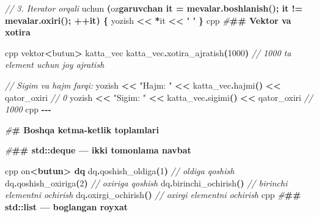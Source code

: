 \documentclass[a4paper,11pt,twoside,openright]{book}
\newenvironment{Shaded}{\begin{snugshade}}{\end{snugshade}}
\newcommand{\CharTok}[1]{\textcolor[rgb]{0.31,0.60,0.02}{#1}}
\newcommand{\CommentTok}[1]{\textcolor[rgb]{0.56,0.35,0.01}{\textit{#1}}}
\newcommand{\DecValTok}[1]{\textcolor[rgb]{0.00,0.00,0.81}{#1}}
\newcommand{\ErrorTok}[1]{\textcolor[rgb]{0.64,0.00,0.00}{\textbf{#1}}}
\newcommand{\NormalTok}[1]{#1}
\newcommand{\OperatorTok}[1]{\textcolor[rgb]{0.81,0.36,0.00}{\textbf{#1}}}
\newcommand{\PreprocessorTok}[1]{\textcolor[rgb]{0.56,0.35,0.01}{\textit{#1}}}
\newcommand{\StringTok}[1]{\textcolor[rgb]{0.31,0.60,0.02}{#1}}
\begin{document}
\begin{Shaded}
\begin{Highlighting}[]
\CommentTok{// 3. Iterator orqali}
\NormalTok{uchun }\OperatorTok{(}\NormalTok{o}\CharTok{\textquotesingle{}z}\ErrorTok{garuvchan it = mevalar.boshlanish(); it != mevalar.oxiri(); ++it) \{}
\NormalTok{    yozish }\OperatorTok{\textless{}\textless{}} \OperatorTok{*}\NormalTok{it }\OperatorTok{\textless{}\textless{}} \StringTok{" "}
\OperatorTok{\}}
\ErrorTok{\textasciigrave{}\textasciigrave{}\textasciigrave{}}\NormalTok{cpp}
\PreprocessorTok{\#}\ErrorTok{\#\# Vektor va xotira}

\ErrorTok{\textasciigrave{}\textasciigrave{}\textasciigrave{}}\NormalTok{cpp}
\NormalTok{vektor}\OperatorTok{\textless{}}\NormalTok{butun}\OperatorTok{\textgreater{}}\NormalTok{ katta\_vec}
\NormalTok{katta\_vec}\OperatorTok{.}\NormalTok{xotira\_ajratish}\OperatorTok{(}\DecValTok{1000}\OperatorTok{)}  \CommentTok{// 1000 ta element uchun joy ajratish}

\CommentTok{// Sig\textquotesingle{}im va hajm farqi:}
\NormalTok{yozish }\OperatorTok{\textless{}\textless{}} \StringTok{"Hajm: "} \OperatorTok{\textless{}\textless{}}\NormalTok{ katta\_vec}\OperatorTok{.}\NormalTok{hajmi}\OperatorTok{()} \OperatorTok{\textless{}\textless{}}\NormalTok{ qator\_oxiri       }\CommentTok{// 0}
\NormalTok{yozish }\OperatorTok{\textless{}\textless{}} \StringTok{"Sig\textquotesingle{}im: "} \OperatorTok{\textless{}\textless{}}\NormalTok{ katta\_vec}\OperatorTok{.}\NormalTok{sigimi}\OperatorTok{()} \OperatorTok{\textless{}\textless{}}\NormalTok{ qator\_oxiri    }\CommentTok{// 1000}
\ErrorTok{\textasciigrave{}\textasciigrave{}\textasciigrave{}}\NormalTok{cpp}
\OperatorTok{{-}{-}{-}}

\PreprocessorTok{\#}\ErrorTok{\# Boshqa ketma{-}ketlik to\textquotesingle{}plamlari}

\PreprocessorTok{\#}\ErrorTok{\#\# \textasciigrave{}std::deque\textasciigrave{} — ikki tomonlama navbat}

\ErrorTok{\textasciigrave{}\textasciigrave{}\textasciigrave{}}\NormalTok{cpp}
\NormalTok{o}\CharTok{\textquotesingle{}n}\ErrorTok{\textless{}butun\textgreater{} dq}
\NormalTok{dq}\OperatorTok{.}\NormalTok{qoshish\_oldiga}\OperatorTok{(}\DecValTok{1}\OperatorTok{)}     \CommentTok{// oldiga qo\textquotesingle{}shish}
\NormalTok{dq}\OperatorTok{.}\NormalTok{qoshish\_oxiriga}\OperatorTok{(}\DecValTok{2}\OperatorTok{)}    \CommentTok{// oxiriga qo\textquotesingle{}shish}
\NormalTok{dq}\OperatorTok{.}\NormalTok{birinchi\_ochirish}\OperatorTok{()}   \CommentTok{// birinchi elementni o\textquotesingle{}chirish}
\NormalTok{dq}\OperatorTok{.}\NormalTok{oxirgi\_ochirish}\OperatorTok{()}     \CommentTok{// oxirgi elementni o\textquotesingle{}chirish}
\ErrorTok{\textasciigrave{}\textasciigrave{}\textasciigrave{}}\NormalTok{cpp}
\PreprocessorTok{\#}\ErrorTok{\#\# \textasciigrave{}std::list\textasciigrave{} — bog\textquotesingle{}langan ro\textquotesingle{}yxat}


\end{Highlighting}
\end{Shaded}
\end{document}
